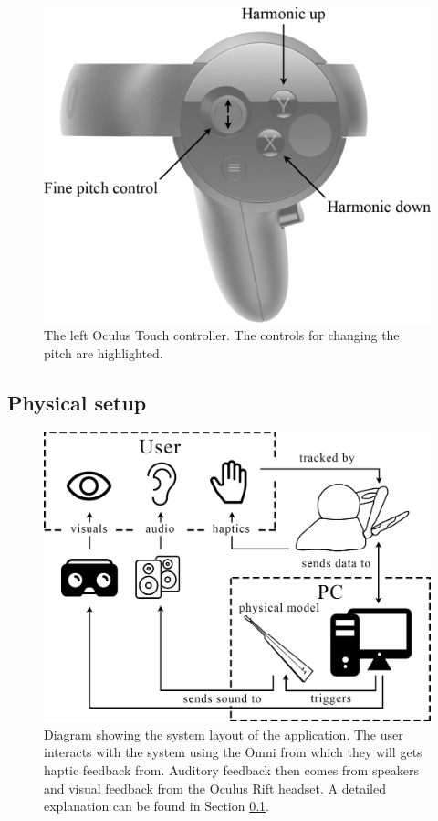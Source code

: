 \documentclass{article}
\begin{document}
\begin{figure}[ht]\includegraphics[width=1.0\columnwidth]{SMC 2020 paper template LaTeX/figures/controller.png}
\centering
  \caption{The left Oculus Touch controller. The controls for changing the pitch are highlighted. \label{fig:oculusController}}
\end{figure}
\subsection{Physical setup}\label{subsec:physicalSetup}
\begin{figure}[ht]\includegraphics[width=1.0\columnwidth]{SMC 2020 paper template LaTeX/figures/blockdiagram.png}
\centering
  \caption{Diagram showing the system layout of the application. The user interacts with the system using the Omni from which they will gets haptic feedback from. Auditory feedback then comes from speakers and visual feedback from the Oculus Rift headset. A detailed explanation can be found in Section \ref{subsec:physicalSetup}. \label{fig:systemLayout}}
\end{figure}
\end{document}
